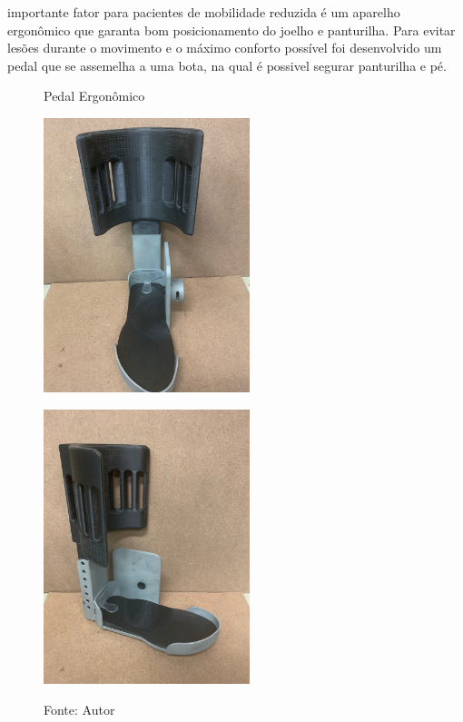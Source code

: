 \documentclass[../poliXuniversity_hospital_(USP)_report.tex]{subfiles}
\begin{document}
importante fator para pacientes de mobilidade reduzida é um aparelho ergonômico que garanta bom posicionamento do joelho e panturilha. Para evitar lesões durante o movimento e o máximo conforto possível foi desenvolvido um pedal que se assemelha a uma bota, na qual é possivel segurar panturilha e pé.

\begin{figure}[h]
\centering
\caption{Pedal Ergonômico}
    \begin{minipage}{0.5\textwidth}
        \centering
        
        \centering %
        \includegraphics[width=6cm]{images/pedal_angulada.jpeg}
        \label{figura: Pedal angulada}
        
    \end{minipage}\hfill
    \begin{minipage}{0.5\textwidth}
    
        \centering
        \centering %
        \includegraphics[width=6cm]{images/Pedal_frontal.jpeg}
        
        \label{figura: Pedal frontal}
        
    \end{minipage}\hfill
    \caption*{Fonte: Autor}
\end{figure}
\end{document}
